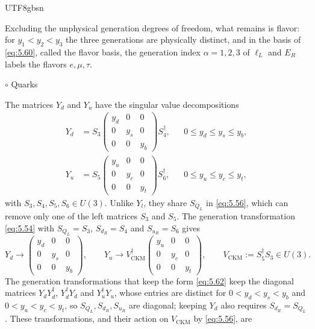 \documentclass[11pt,a4paper,oneside]{report}
\makeatletter
\newcommand\divtitle[1]{\par\addvspace{1.1ex}\noindent
  {\normalfont\normalsize #1}\par\nobreak\vspace{.35ex}\@afterindentfalse\@afterheading}
\newenvironment{qftinset}{\begin{list}{}{\setlength{\leftmargin}{2em}\setlength{\rightmargin}{0pt}\setlength{\listparindent}{\parindent}}\item[]}{\end{list}}
\makeatother
\begin{document}
\begin{CJK*}{UTF8}{gbsn}
\begin{qftinset}
Excluding the unphysical generation degrees of freedom, what remains is flavor: for $y_1<y_2<y_3$ the three generations are physically distinct, and in the basis of \eqref{eq:5.60}, called the flavor basis, the generation index $\alpha=1,2,3$ of $\ell_L$ and $E_R$ labels the flavors $e,\mu,\tau$.

\end{qftinset}

\begin{qftinset}

\divtitle{$\circ$ Quarks}

The matrices $Y_d$ and $Y_u$ have the singular value decompositions
\begin{equation*}
\begin{aligned}
Y_d&=S_3\begin{pmatrix}y_d&0&0\\0&y_s&0\\0&0&y_b\end{pmatrix}S_4^\dagger,&&0\le y_d\le y_s\le y_b,\\
Y_u&=S_5\begin{pmatrix}y_u&0&0\\0&y_c&0\\0&0&y_t\end{pmatrix}S_6^\dagger,&&0\le y_u\le y_c\le y_t,
\end{aligned}
\tag{5.61}\label{eq:5.61}
\end{equation*}
with $S_3,S_4,S_5,S_6\in U(3)$. Unlike $Y_l$, they share $S_{Q_L}$ in \eqref{eq:5.56}, which can remove only one of the left matrices $S_3$ and $S_5$. The generation transformation \eqref{eq:5.54} with $S_{Q_L}=S_3$, $S_{d_R}=S_4$ and $S_{u_R}=S_6$ gives
\begin{equation*}
{\displaystyle Y_d\to\begin{pmatrix}y_d&0&0\\0&y_s&0\\0&0&y_b\end{pmatrix},\qquad Y_u\to V_{\mathrm{CKM}}^\dagger\begin{pmatrix}y_u&0&0\\0&y_c&0\\0&0&y_t\end{pmatrix}},\qquad V_{\mathrm{CKM}}:=S_5^\dagger S_3\in U(3).
\tag{5.62}\label{eq:5.62}
\end{equation*}
The generation transformations that keep the form \eqref{eq:5.62} keep the diagonal matrices $Y_dY_d^\dagger$, $Y_d^\dagger Y_d$ and $Y_u^\dagger Y_u$, whose entries are distinct for $0<y_d<y_s<y_b$ and $0<y_u<y_c<y_t$, so $S_{Q_L},S_{d_R},S_{u_R}$ are diagonal; keeping $Y_d$ also requires $S_{d_R}=S_{Q_L}$. These transformations, and their action on $V_{\mathrm{CKM}}$ by \eqref{eq:5.56}, are

\end{qftinset}
\end{CJK*}
\end{document}
